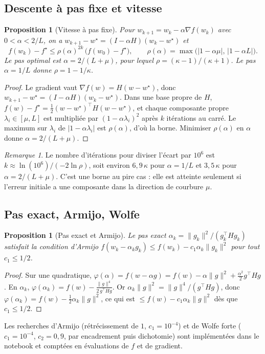 \documentclass[11pt,a4paper]{article}
\newtheorem{proposition}[theorem]{Proposition}
\theoremstyle{remark}
\newtheorem{remark}[theorem]{Remarque}
\theoremstyle{definition}
\newcommand{\T}{^{\top}}
\begin{document}
\subsection{Descente à pas fixe et vitesse}
\begin{proposition}[Vitesse à pas fixe]\label{prop:fixe}
Pour $w_{k+1} = w_k - \alpha\nabla f(w_k)$ avec $0 < \alpha < 2/L$, on a
$w_{k+1} - w^\star = (I - \alpha H)(w_k - w^\star)$ et
\[
f(w_k) - f^\star \le \rho(\alpha)^{2k}\,\bigl(f(w_0) - f^\star\bigr), \qquad \rho(\alpha) = \max\bigl(|1-\alpha\mu|,\,|1-\alpha L|\bigr).
\]
Le pas optimal est $\alpha = 2/(L+\mu)$, pour lequel $\rho = (\kappa-1)/(\kappa+1)$. Le pas $\alpha = 1/L$ donne $\rho = 1-1/\kappa$.
\end{proposition}
\begin{proof}
Le gradient vaut $\nabla f(w) = H(w - w^\star)$, donc $w_{k+1} - w^\star = (I-\alpha H)(w_k-w^\star)$. Dans une base propre de $H$,
$f(w) - f^\star = \frac12 (w-w^\star)\T H (w-w^\star)$, et chaque composante propre $\lambda_i \in [\mu, L]$ est multipliée par $(1-\alpha\lambda_i)^{2}$ après $k$ itérations au carré.
Le maximum sur $\lambda_i$ de $|1-\alpha\lambda_i|$ est $\rho(\alpha)$, d'où la borne. Minimiser $\rho(\alpha)$ en $\alpha$ donne $\alpha = 2/(L+\mu)$.
\end{proof}

\begin{remark}
Le nombre d'itérations pour diviser l'écart par $10^6$ est $k \approx \ln(10^6)/(-2\ln\rho)$, soit environ $6{,}9\,\kappa$ pour $\alpha = 1/L$
et $3{,}5\,\kappa$ pour $\alpha = 2/(L+\mu)$. C'est une borne au pire cas : elle est atteinte seulement si l'erreur initiale a une composante
dans la direction de courbure $\mu$.
\end{remark}

\subsection{Pas exact, Armijo, Wolfe}
\begin{proposition}[Pas exact et Armijo]\label{prop:exact}
Le pas exact $\alpha_k = \|g_k\|^2 / (g_k\T H g_k)$ satisfait la condition d'Armijo $f(w_k - \alpha_k g_k) \le f(w_k) - c_1\alpha_k\|g_k\|^2$
pour tout $c_1 \le 1/2$.
\end{proposition}
\begin{proof}
Sur une quadratique, $\varphi(\alpha) = f(w - \alpha g) = f(w) - \alpha\|g\|^2 + \frac{\alpha^2}{2} g\T H g$. En $\alpha_k$,
$\varphi(\alpha_k) = f(w) - \frac{\|g\|^4}{2\,g\T H g}$. Or $\alpha_k\|g\|^2 = \|g\|^4/(g\T H g)$, donc $\varphi(\alpha_k) = f(w) - \tfrac12\alpha_k\|g\|^2$,
ce qui est $\le f(w) - c_1\alpha_k\|g\|^2$ dès que $c_1 \le 1/2$.
\end{proof}
Les recherches d'Armijo (rétrécissement de $1$, $c_1 = 10^{-4}$) et de Wolfe forte ($c_1 = 10^{-4}$, $c_2 = 0{,}9$, par encadrement puis dichotomie)
sont implémentées dans le notebook et comptées en évaluations de $f$ et de gradient.
\end{document}
